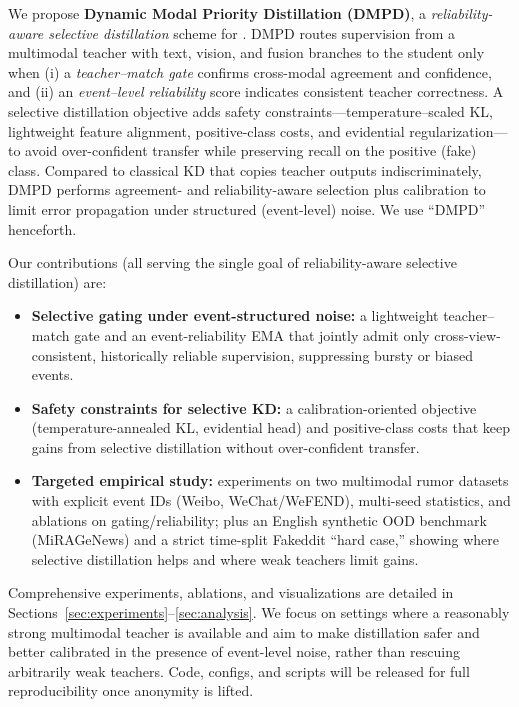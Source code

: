 We propose \textbf{Dynamic Modal Priority Distillation (DMPD)}, a \emph{reliability-aware selective distillation} scheme for \taskname{}. DMPD routes supervision from a multimodal teacher with text, vision, and fusion branches to the student only when (i) a \emph{teacher–match gate} confirms cross-modal agreement and confidence, and (ii) an \emph{event–level reliability} score indicates consistent teacher correctness. A selective distillation objective adds safety constraints—temperature–scaled KL, lightweight feature alignment, positive-class costs, and evidential regularization—to avoid over-confident transfer while preserving recall on the positive (fake) class. Compared to classical KD that copies teacher outputs indiscriminately, DMPD performs agreement- and reliability-aware selection plus calibration to limit error propagation under structured (event-level) noise. We use “DMPD” henceforth.

Our contributions (all serving the single goal of reliability-aware selective distillation) are:
\begin{itemize}
  \item \textbf{Selective gating under event-structured noise:} a lightweight teacher–match gate and an event-reliability EMA that jointly admit only cross-view-consistent, historically reliable supervision, suppressing bursty or biased events.
  \item \textbf{Safety constraints for selective KD:} a calibration-oriented objective (temperature-annealed KL, evidential head) and positive-class costs that keep gains from selective distillation without over-confident transfer.
  \item \textbf{Targeted empirical study:} experiments on two multimodal rumor datasets with explicit event IDs (Weibo, WeChat/WeFEND), multi-seed statistics, and ablations on gating/reliability; plus an English synthetic OOD benchmark (MiRAGeNews) and a strict time-split Fakeddit “hard case,” showing where selective distillation helps and where weak teachers limit gains.
\end{itemize}

Comprehensive experiments, ablations, and visualizations are detailed in Sections~\ref{sec:experiments}--\ref{sec:analysis}. We focus on settings where a reasonably strong multimodal teacher is available and aim to make distillation safer and better calibrated in the presence of event-level noise, rather than rescuing arbitrarily weak teachers. Code, configs, and scripts will be released for full reproducibility once anonymity is lifted.
